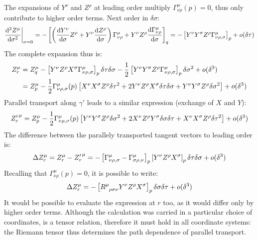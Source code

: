 The expansions of $ Y^\nu $ and $ Z^\rho $ at leading order multiply $ \Gamma^\mu_{\nu \rho}(p) = 0 $, thus only contribute to higher order terms. Next order in $ \delta \sigma $:
\begin{equation*}
  \frac{\mathrm{d}^2 Z^\mu}{\mathrm{d} \sigma^2}\bigg\vert_{\sigma = 0} = - \left[ \left( \frac{\mathrm{d} Y^\nu}{\mathrm{d} \sigma} Z^\rho + Y^\nu \frac{\mathrm{d} Z^\rho}{\mathrm{d} \sigma} \right) \Gamma^\mu_{\nu \rho} + Y^\nu Z^\rho \frac{\mathrm{d} \Gamma^\mu_{\nu \rho}}{\mathrm{d} \sigma} \right]_q = - \left[ Y^\nu Y^\sigma Z^\rho \Gamma^\mu_{\nu \rho , \sigma} \right]_p + o(\delta\tau)
\end{equation*}
The complete expansion thus is:
\begin{equation*}
  \begin{split}
    Z_r^\mu
    &= Z_q^\mu - \left[ Y^\nu Z^\rho X^\sigma \Gamma^\mu_{\nu \rho , \sigma} \right]_p \delta\tau \delta\sigma - \frac{1}{2} \left[ Y^\nu Y^\sigma Z^\rho \Gamma^\mu_{\nu \rho , \sigma} \right]_p \delta\sigma^2 + o(\delta^3) \\
    &= Z_p^\mu - \frac{1}{2} \Gamma^\mu_{\nu \rho , \sigma}(p) \left[ X^\nu X^\sigma Z^\rho \delta\tau^2 + 2 Y^\nu Z^\rho X^\sigma \delta\tau \delta\sigma + Y^\nu Y^\sigma Z^\rho \delta\sigma^2 \right] + o(\delta^3)
  \end{split}
\end{equation*}
Parallel transport along $ \gamma' $ leads to a similar expression (exchange of $ X $ and $ Y $):
\begin{equation*}
  {Z'_r}^\mu = Z_p^\mu - \frac{1}{2} \Gamma^\mu_{\nu \rho , \sigma}(p) \left[ Y^\nu Y^\sigma Z^\rho \delta\sigma^2 + 2 X^\nu Z^\rho Y^\sigma \delta\sigma \delta\tau + X^\nu X^\sigma Z^\rho \delta\tau^2 \right] + o(\delta^3)
\end{equation*}
The difference between the parallely transported tangent vectors to leading order is:
\begin{equation*}
  \Delta Z_r^\mu = Z_r^\mu - {Z'_r}^\mu = - \left[ \Gamma^\mu_{\nu \rho , \sigma} - \Gamma^\mu_{\sigma \rho , \nu} \right]_p \left[ Y^\nu Z^\rho X^\sigma \right]_p \delta\tau \delta\sigma + o(\delta^3)
\end{equation*}
Recalling that $ \Gamma^\mu_{\nu \rho}(p) = 0 $, it is possible to write:
\begin{equation}
  \Delta Z_r^\mu = - \left[ \tensor{R}{^\mu_{\rho \sigma \nu}} Y^\nu Z^\rho X^\sigma \right]_p \delta\sigma \delta\tau + \smo(\delta^3)
  \label{eq:deviation}
\end{equation}
It would be possible to evaluate the expression at $ r $ too, as it would differ only by higher order terms. Although the calculation was carried in a particular choice of coordinates,  is a tensor relation, therefore it must hold in all coordinate systems: the Riemann tensor thus determines the path dependence of parallel transport.


